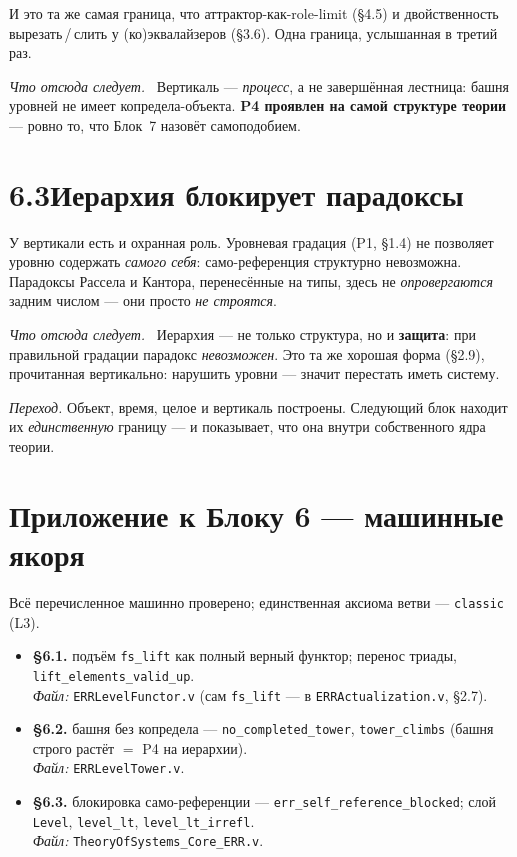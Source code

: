 \documentclass[12pt,a4paper]{article}
\newcommand{\rezultat}{\medskip\noindent\emph{Что отсюда следует.}\ }
\begin{document}
И это та же самая граница, что аттрактор-как-role-limit (§4.5) и двойственность вырезать\,/\,слить у
(ко)эквалайзеров (§3.6). Одна граница, услышанная в третий раз.

\rezultat
Вертикаль --- \emph{процесс}, а не завершённая лестница: башня уровней не имеет копредела-объекта.
\textbf{P4 проявлен на самой структуре теории} --- ровно то, что Блок~7 назовёт самоподобием.

\section*{6.3\quad Иерархия блокирует парадоксы}

У вертикали есть и охранная роль. Уровневая градация (P1, §1.4) не позволяет уровню содержать
\emph{самого себя}: само-референция структурно невозможна. Парадоксы Рассела и Кантора, перенесённые
на типы, здесь не \emph{опровергаются} задним числом --- они просто \emph{не строятся}.

\rezultat
Иерархия --- не только структура, но и \textbf{защита}: при правильной градации парадокс
\emph{невозможен}. Это та же хорошая форма (§2.9), прочитанная вертикально: нарушить уровни --- значит
перестать иметь систему.

\medskip
\noindent\emph{Переход.} Объект, время, целое и вертикаль построены. Следующий блок находит их
\emph{единственную} границу --- и показывает, что она внутри собственного ядра теории.

\appendix
\section*{Приложение к Блоку 6 — машинные якоря}
\small\raggedright\sloppy
\noindent Всё перечисленное машинно проверено; единственная аксиома ветви --- \texttt{classic} (L3).

\begin{itemize}\itemsep2pt
\item \textbf{§6.1.} подъём \texttt{fs\_lift} как полный верный функтор; перенос триады,
\texttt{lift\_elements\_valid\_up}.\\
\emph{Файл:} \texttt{ERRLevelFunctor.v} (сам \texttt{fs\_lift} --- в \texttt{ERRActualization.v}, §2.7).

\item \textbf{§6.2.} башня без копредела --- \texttt{no\_completed\_tower}, \texttt{tower\_climbs}
(башня строго растёт $=$ P4 на иерархии).\\
\emph{Файл:} \texttt{ERRLevelTower.v}.

\item \textbf{§6.3.} блокировка само-референции --- \texttt{err\_self\_reference\_blocked}; слой
\texttt{Level}, \texttt{level\_lt}, \texttt{level\_lt\_irrefl}.\\
\emph{Файл:} \texttt{TheoryOfSystems\_Core\_ERR.v}.
\end{itemize}
\normalsize

\end{document}
